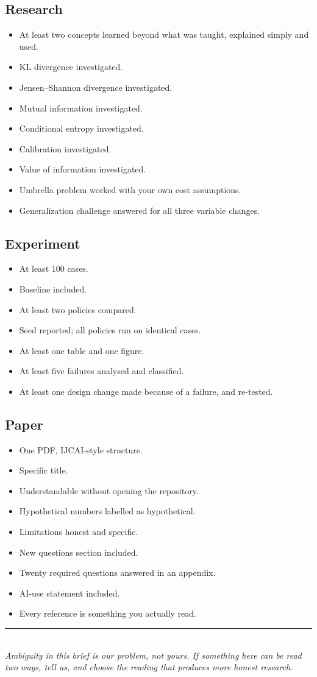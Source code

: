 \documentclass[11pt,a4paper]{article}
\begin{document}
\subsection*{Research}
\begin{itemize}[label=$\square$]
\item At least two concepts learned beyond what was taught, explained simply and used.
\item KL divergence investigated.
\item Jensen--Shannon divergence investigated.
\item Mutual information investigated.
\item Conditional entropy investigated.
\item Calibration investigated.
\item Value of information investigated.
\item Umbrella problem worked with your own cost assumptions.
\item Generalization challenge answered for all three variable changes.
\end{itemize}

\subsection*{Experiment}
\begin{itemize}[label=$\square$]
\item At least 100 cases.
\item Baseline included.
\item At least two policies compared.
\item Seed reported; all policies run on identical cases.
\item At least one table and one figure.
\item At least five failures analysed and classified.
\item At least one design change made because of a failure, and re-tested.
\end{itemize}

\subsection*{Paper}
\begin{itemize}[label=$\square$]
\item One PDF, IJCAI-style structure.
\item Specific title.
\item Understandable without opening the repository.
\item Hypothetical numbers labelled as hypothetical.
\item Limitations honest and specific.
\item New questions section included.
\item Twenty required questions answered in an appendix.
\item AI-use statement included.
\item Every reference is something you actually read.
\end{itemize}

\vfill
\begin{center}
{\color{sbrule}\rule{0.5\textwidth}{0.4pt}}\\[0.4cm]
{\footnotesize\itshape Ambiguity in this brief is our problem, not yours. If something here can be
read two ways, tell us, and choose the reading that produces more honest research.}
\end{center}
\end{document}
